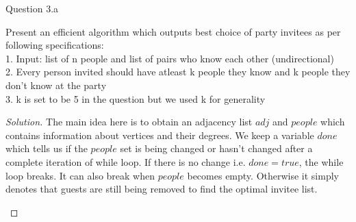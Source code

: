 \begin{solution}{Question 3.a}
    \begin{question}[]
        Present an efficient algorithm which outputs best choice of party invitees as per following specifications:\\
        1. Input: list of n people and list of pairs who know each other (undirectional)\\
        2. Every person invited should have atleast k people they know and k people they don't know at the party\\
        3. k is set to be 5 in the question but we used k for generality
    \end{question}
    \tcblower{}
    \begin{proof}[Solution]
        The main idea here is to obtain an adjacency list $adj$ and $people$ which contains information about vertices and their degrees. We keep a variable $done$ which tells us if the $people$ set is being changed or hasn't changed after a complete iteration of while loop. If there is no change i.e. $done=true$, the while loop breaks. It can also break when $people$ becomes empty. Otherwise it simply denotes that guests are still being removed to find the optimal invitee list.
        \begin{algorithm}[H]
            \caption{Generate list of invitees for 3.a}
            \begin{algorithmic}[1]
                     
                     
                     
                    \EndFor{}
                     
                    \EndFor{}
                    

\end{algorithmic}
\end{algorithm}
\end{proof}
\end{solution}

